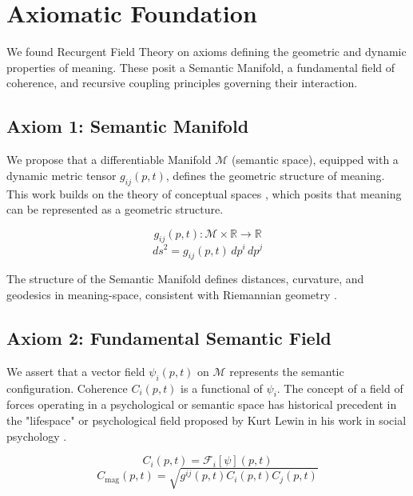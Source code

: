 \chapter{Axiomatic Foundation}\label{ch:axiomatic_foundation}

We found Recurgent Field Theory on axioms defining the geometric and dynamic properties of meaning. These posit a Semantic Manifold, a fundamental field of coherence, and recursive coupling principles governing their interaction.

\section{Axiom 1: Semantic Manifold}\label{axiom_1}

We propose that a differentiable Manifold \(\mathcal{M}\) (semantic space), equipped with a dynamic metric tensor \(g_{ij}(p,t)\), defines the geometric structure of meaning. This work builds on the theory of conceptual spaces \autocite{Gardenfors2000}, which posits that meaning can be represented as a geometric structure.

\begin{equation}
g_{ij}(p,t) : \mathcal{M} \times \mathbb{R} \rightarrow \mathbb{R}
\end{equation}
\begin{equation}
ds^2 = g_{ij}(p,t) \, dp^i \, dp^j
\end{equation}

The structure of the Semantic Manifold defines distances, curvature, and geodesics in meaning-space, consistent with Riemannian geometry \autocite{Riemann1868}.

\section{Axiom 2: Fundamental Semantic Field}\label{axiom_2}

We assert that a vector field \(\psi_i(p,t)\) on \(\mathcal{M}\) represents the semantic configuration. Coherence \(C_i(p,t)\) is a functional of \(\psi_i\). The concept of a field of forces operating in a psychological or semantic space has historical precedent in the "lifespace" or psychological field proposed by Kurt Lewin in his work in social psychology \autocite{Lewin1951}.

\begin{equation}
C_i(p,t) = \mathcal{F}_i[\psi](p,t)
\end{equation}
\begin{equation}
C_{\text{mag}}(p,t) = \sqrt{g^{ij}(p,t) C_i(p,t) C_j(p,t)}
\end{equation}

